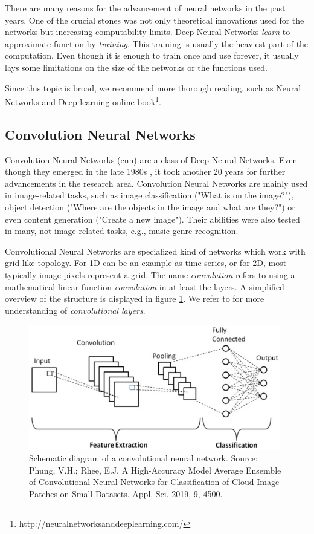 There are many reasons for the advancement of neural networks in the past years. One of the crucial stones was not only theoretical innovations used for the networks but increasing computability limits. Deep Neural Networks \emph{learn} to approximate function by \emph{training}. This training is usually the heaviest part of the computation. Even though it is enough to train once and use forever, it usually lays some limitations on the size of the networks or the functions used.

Since this topic is broad, we recommend more thorough reading, such as Neural Networks and Deep learning online book\footnote{http://neuralnetworksanddeeplearning.com/}.

\subsection{Convolution Neural Networks}

Convolution Neural Networks (\acrshort{cnn}) are a class of Deep Neural Networks. Even though they emerged in the late 1980s \citep{lecun1989backpropagation}, it took another 20 years for further advancements in the research area. Convolution Neural Networks are mainly used in image-related tasks, such as image classification ("What is on the image?"), object detection ("Where are the objects in the image and what are they?") or even content generation ("Create a new image"). Their abilities were also tested in many, not image-related tasks, e.g., music genre recognition.

Convolutional Neural Networks are specialized kind of networks which work with grid-like topology. For 1D can be an example as time-series, or for 2D, most typically image pixels represent a grid. The name \emph{convolution} refers to using a mathematical linear function \emph{convolution} in at least the layers. A simplified overview of the structure is displayed in figure \ref{fig:convolution_neural_network}. We refer to \cite{Goodfellow-et-al-2016} for more understanding of \emph{convolutional layers}.

\begin{figure}
    \centering
    \includegraphics[width=0.98\textwidth]{img/convolution_neural_network.jpg}
    \caption{Schematic diagram of a convolutional neural network. Source: Phung, V.H.; Rhee, E.J. A High-Accuracy Model Average Ensemble of Convolutional Neural Networks for Classification of Cloud Image Patches on Small Datasets. Appl. Sci. 2019, 9, 4500.}
    \label{fig:convolution_neural_network}
\end{figure}

